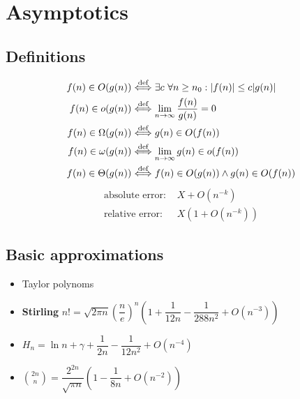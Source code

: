 \section{Asymptotics}
\subsection{Definitions}
\begin{align*}
f(n) \in O(g(n)) &\overset{\text{def}}{\Longleftrightarrow} \exists c ~ \forall n \geq n_0 : |f(n)| \leq c|g(n)|\\
f(n) \in o(g(n)) &\overset{\text{def}}{\Longleftrightarrow} \lim_{n \to \infty} \dfrac{f(n)}{g(n)} = 0 \\
f(n) \in \Omega(g(n)) &\overset{\text{def}}{\Longleftrightarrow} g(n) \in O(f(n))\\
f(n) \in \omega(g(n)) &\overset{\text{def}}{\Longleftrightarrow} \lim_{n \to \infty} g(n) \in o(f(n)) \\
f(n) \in \Theta(g(n)) &\overset{\text{def}}{\Longleftrightarrow} f(n) \in O(g(n)) \wedge g(n) \in O(f(n)) \\
\end{align*}
\begin{align*}
\text{absolute error: }& X + O(n^{-k})\\
\text{relative error: }& X (1 + O(n^{-k}))
\end{align*}

\subsection{Basic approximations}
\begin{itemize}
\item Taylor polynoms 
\item \textbf{Stirling} $n! = \sqrt{2 \pi n} \left( \dfrac{n}{e} \right)^n \left(1 + \dfrac{1}{12n} - \dfrac{1}{288n^2} + O(n^{-3}) \right)$
\item $H_n = \ln n + \gamma + \dfrac{1}{2n} - \dfrac{1}{12n^2} + O(n^{-4})$
\item ${2n \choose n} = \dfrac{2^{2n}}{\sqrt{\pi n}} \left( 1 - \dfrac{1}{8n} + O\left(n^{-2}\right) \right)$
\end{itemize}
